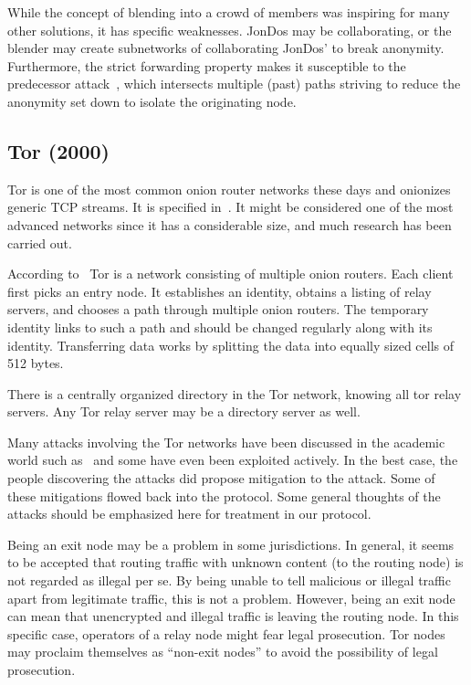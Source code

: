 While the concept of blending into a crowd of members was inspiring for many other solutions, it has specific weaknesses. JonDos may be collaborating, or the blender may create subnetworks of collaborating JonDos' to break anonymity. Furthermore, the strict forwarding property makes it susceptible to the predecessor attack~\cite{wright2004predecessor}, which intersects multiple (past) paths striving to reduce the anonymity set down to isolate the originating node.

\subsection{Tor (2000)}\label{sec:tor}
Tor is one of the most common onion router networks these days and onionizes generic TCP streams. It is specified in~\cite{tor-spec}. It might be considered one of the most advanced networks since it has a considerable size, and much research has been carried out.

According to~\cite{onion-routing:pet2000} Tor is a network consisting of multiple onion routers. Each client first picks an entry node. It establishes an identity, obtains a listing of relay servers, and chooses a path through multiple onion routers. The temporary identity links to such a path and should be changed regularly along with its identity. Transferring data works by splitting the data into equally sized cells of 512 bytes.

There is a centrally organized directory in the Tor network, knowing all tor relay servers. Any Tor relay server may be a directory server as well. 

Many attacks involving the Tor networks have been discussed in the academic world such as~\cite{hs-attack06,esorics13-cellflood,bauer:wpes2007,esorics12-torscan,oakland2013-trawling,danner-et-al:tissec12,congestion-longpaths} and some have even been exploited actively. In the best case, the people discovering the attacks did propose mitigation to the attack. Some of these mitigations flowed back into the protocol. Some general thoughts of the attacks should be emphasized here for treatment in our protocol.

Being an exit node may be a problem in some jurisdictions. In general, it seems to be accepted that routing traffic with unknown content (to the routing node) is not regarded as illegal per se. By being unable to tell malicious or illegal traffic apart from legitimate traffic, this is not a problem. However, being an exit node can mean that unencrypted and illegal traffic is leaving the routing node. In this specific case, operators of a relay node might fear legal prosecution. Tor nodes may proclaim themselves as  ``non-exit nodes''  to avoid the possibility of legal prosecution.

